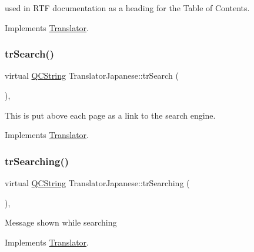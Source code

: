 used in R\+TF documentation as a heading for the Table of Contents. 

Implements \mbox{\hyperlink{class_translator}{Translator}}.

\mbox{\label{class_translator_japanese_aa2ecc8562e45c1e8ee020cd2a51923a1}} 
\subsubsection{\texorpdfstring{trSearch()}{trSearch()}}
{\footnotesize\ttfamily virtual \mbox{\hyperlink{class_q_c_string}{Q\+C\+String}} Translator\+Japanese\+::tr\+Search (\begin{DoxyParamCaption}{ }\end{DoxyParamCaption})\hspace{0.3cm}{\ttfamily [inline]}, {\ttfamily [virtual]}}

This is put above each page as a link to the search engine. 

Implements \mbox{\hyperlink{class_translator}{Translator}}.

\mbox{\label{class_translator_japanese_a6e75ae8c17f2b5b43814b15eaf7693c9}} 
\subsubsection{\texorpdfstring{trSearching()}{trSearching()}}
{\footnotesize\ttfamily virtual \mbox{\hyperlink{class_q_c_string}{Q\+C\+String}} Translator\+Japanese\+::tr\+Searching (\begin{DoxyParamCaption}{ }\end{DoxyParamCaption})\hspace{0.3cm}{\ttfamily [inline]}, {\ttfamily [virtual]}}

Message shown while searching 

Implements \mbox{\hyperlink{class_translator}{Translator}}.

\mbox{\label{class_translator_japanese_ace28229368ed50a03b464c93f64165d9}} 
